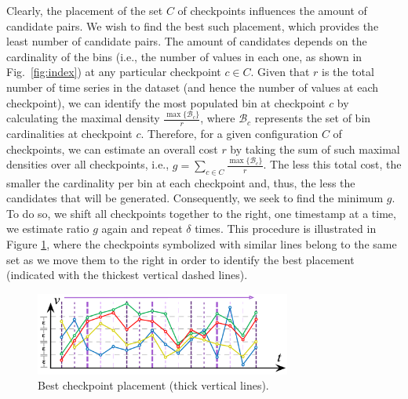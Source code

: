 Clearly, the placement of the set $C$ of checkpoints influences the amount of candidate pairs. We wish to find the best such placement, which provides the least number of candidate pairs. The amount of candidates depends on the cardinality of the bins (i.e., the number of values in each one, as shown in Fig.~\ref{fig:index}) at any particular checkpoint $c \in C$. Given that $r$ is the total number of time series in the dataset (and hence the number of values at each checkpoint), we can identify the most populated bin at checkpoint $c$ by calculating the maximal density $\frac{\max\{\mathcal{B}_{c}\}}{r}$, where $\mathcal{B}_{c}$ represents the set of bin cardinalities at checkpoint $c$. Therefore, for a given configuration $C$ of checkpoints, we can estimate an overall cost $r$ by taking the sum of such maximal densities over all checkpoints, i.e.,  $g=\sum_{c \in C}{\frac{\max\{\mathcal{B}_{c}\}}{r}}$. The less this total cost, the smaller the cardinality per bin at each checkpoint and, thus, the less the candidates that will be generated. Consequently, we seek to find the minimum $g$. To do so, we shift all checkpoints together to the right, one timestamp at a time, we estimate ratio $g$ again and repeat $\delta$ times. This procedure is illustrated in Figure \ref{fig:heuristic1}, where the checkpoints symbolized with similar lines belong to the same set as we move them to the right in order to identify the best placement (indicated with the thickest vertical dashed lines).

\begin{figure}[tb]
    \centering
    \includegraphics[width=0.75\textwidth]{figures/heuristic.png}
    \caption{Best checkpoint placement (thick vertical lines).}
    \label{fig:heuristic1}
\end{figure}


